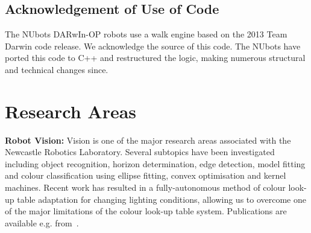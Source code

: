 \documentclass{llncs}
\begin{document}



\subsection{Acknowledgement of Use of Code}
The NUbots DARwIn-OP robots use a walk engine based on the 2013 Team Darwin code release. We acknowledge the source of this code. The NUbots have ported this code to C++ and restructured the logic, making numerous structural and technical changes since. %

\section{Research Areas}

\noindent\textbf{Robot Vision:} Vision is one of the major research areas associated with the Newcastle Robotics Laboratory. Several subtopics have been investigated including object recognition, horizon determination, edge detection, model fitting and colour classification using ellipse fitting, convex optimisation and kernel machines. Recent work has resulted in a fully-autonomous method of colour look-up table adaptation for changing lighting conditions, allowing us to overcome one of the major limitations of the colour look-up table system. Publications are available e.g. from~\cite{budden2012colour,budden2012ball,henderson_2007,nicklin_2007,NUBOT2006,QuinlanEtAlNIPS2003,Henderson2008,HoulistonEtAl2015,MetcalfeEtAl2016}.
\end{document}
